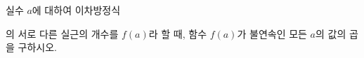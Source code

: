 실수 $a$에 대하여 이차방정식 \par\smallskip{}\par\smallskip\noindent 의 서로 다른 실근의 개수를 $f(a)$라 할 때, 함수 $f(a)$가 불연속인 모든 $a$의 값의 곱을 구하시오.
